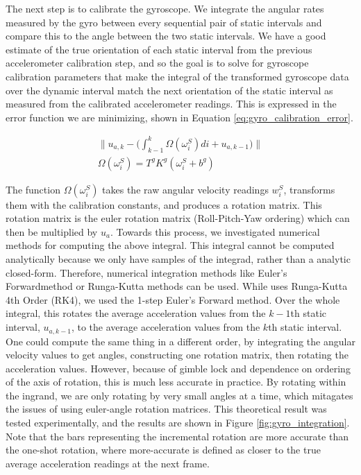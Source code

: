 \documentclass{article}
\begin{document}
    The next step is to calibrate the gyroscope. We integrate the angular rates measured by the gyro between every sequential pair of static intervals and compare this to the angle between the two static intervals. We have a good estimate of the true orientation of each static interval from the previous accelerometer calibration step, and so the goal is to solve for gyroscope calibration parameters that make the integral of the transformed gyroscope data over the dynamic interval match the next orientation of the static interval as measured from the calibrated accelerometer readings. This is expressed in the error function we are minimizing, shown in Equation \ref{eq:gyro_calibration_error}.

    \begin{equation} \label{eq:gyro_calibration_error}
      \begin{split}
        \bigg\lVert u_{a,k} - \bigg(\int_{k-1}^{k} \Omega(\omega^S_i)di + u_{a,k-1}\bigg) \bigg\lVert \\
      \Omega(\omega^S_i) = T^gK^g(\omega^S_i+b^g)
      \end{split}
    \end{equation}

    The function $\Omega(\omega^S_i)$ takes the raw angular velocity readings $w^S_i$, transforms them with the calibration constants, and produces a rotation matrix. This rotation matrix is the euler rotation matrix (Roll-Pitch-Yaw ordering) which can then be multiplied by $u_a$. Towards this process, we investigated numerical methods for computing the above integral. This integral cannot be computed analytically because we only have samples of the integrad, rather than a analytic closed-form. Therefore, numerical integration methods like Euler's Forwardmethod or Runga-Kutta methods can be used. While \cite{tedaldi_robust_2014} uses Runga-Kutta 4th Order (RK4), we used the 1-step Euler's Forward method. Over the whole integral, this rotates the average acceleration values from the $k-1$th static interval, $u_{a,k-1}$, to the average acceleration values from the $k$th static interval. One could compute the same thing in a different order, by integrating the angular velocity values to get angles, constructing one rotation matrix, then rotating the acceleration values. However, because of gimble lock and dependence on ordering of the axis of rotation, this is much less accurate in practice. By rotating within the ingrand, we are only rotating by very small angles at a time, which mitagates the issues of using euler-angle rotation matrices. This theoretical result was tested experimentally, and the results are shown in Figure \ref{fig:gyro_integration}. Note that the bars representing the incremental rotation are more accurate than the one-shot rotation, where more-accurate is defined as closer to the true average acceleration readings at the next frame.
\end{document}
